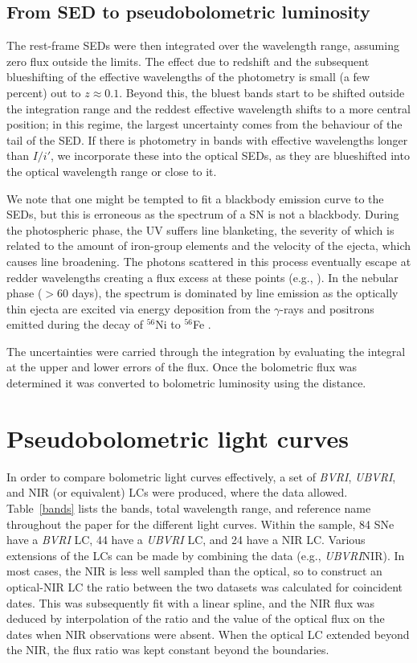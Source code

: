 \documentclass[a4paper,fleqn,usenatbib]{mnras}
\begin{document}
\subsection{From SED to pseudobolometric luminosity}
The rest-frame SEDs were then integrated over the wavelength range, assuming zero flux outside the limits. 
The effect due to redshift and the subsequent blueshifting of the effective wavelengths of the photometry is small (a few percent) out to $z \approx 0.1$. Beyond this, the bluest bands start to be shifted outside the integration range and the reddest effective wavelength shifts to a more central position; in this regime, the largest uncertainty comes from the behaviour of the tail of the SED. If there is photometry in bands with effective wavelengths longer than $I/i'$, we incorporate these into the optical SEDs, as they are blueshifted into the optical wavelength range or close to it.

We note that one might be tempted to fit a blackbody emission curve to the SEDs, but this is erroneous as the spectrum of a SN is not a blackbody. During the photospheric phase, the UV suffers line blanketing, the severity of which is related to the amount of iron-group elements \citep{Mazzali2000UV} and the velocity of the ejecta, which causes line broadening. The photons scattered in this process eventually escape at redder wavelengths creating a flux excess at these points (e.g., \citealt{Mazzali1993}). In the nebular phase ($> 60$ days), the spectrum is dominated by line emission as the optically thin ejecta are excited via energy deposition from the $\gamma$-rays and positrons emitted during the decay of $^{56}$Ni to $^{56}$Fe \citep{Mazzali2005}. 

The uncertainties were carried through the integration by evaluating the integral at the upper and lower errors of the flux. Once the bolometric flux was determined it was converted to bolometric luminosity using the distance.

\section{Pseudobolometric light curves}
In order to compare bolometric light curves effectively, a set of \textit{BVRI}, \textit{UBVRI}, and NIR (or equivalent) LCs were produced, where the data allowed. Table~\ref{bands} lists the bands, total wavelength range, and reference name throughout the paper for the different light curves. Within the sample, 84 SNe have a \textit{BVRI} LC, 44 have a \textit{UBVRI} LC, and 24 have a NIR LC. Various extensions of the LCs can be made by combining the data (e.g., \textit{UBVRI}NIR). In most cases, the NIR is less well sampled than the optical, so to construct an optical-NIR LC the ratio between the two datasets was calculated for coincident dates. This was subsequently fit with a linear spline, and the NIR flux was deduced by interpolation of the ratio and the value of the optical flux on the dates when NIR observations were absent. When the optical LC extended beyond the NIR, the flux ratio was kept constant beyond the boundaries.  
\end{document}
